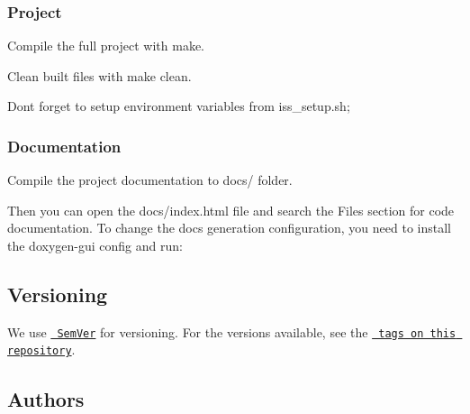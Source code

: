 \subsubsection*{Project}


\begin{DoxyItemize}
\item Compile the full project with {\ttfamily make}.
\item Clean built files with {\ttfamily make clean}.
\end{DoxyItemize}

Don\textquotesingle{}t forget to setup environment variables from {\ttfamily iss\+\_\+setup.\+sh};

\subsubsection*{Documentation}

Compile the project documentation to {\ttfamily docs/} folder. 
\begin{DoxyCode}{0}
\end{DoxyCode}


Then you can open the {\ttfamily docs/index.\+html} file and search the {\ttfamily Files} section for code documentation. To change the docs generation configuration, you need to install the {\ttfamily doxygen-\/gui} config and run\+: 
\begin{DoxyCode}{0}
\end{DoxyCode}


\subsection*{Versioning}

We use \href{http://semver.org/}{\texttt{ Sem\+Ver}} for versioning. For the versions available, see the \href{https://github.com/FranciscoKnebel/quansershield2/tags}{\texttt{ tags on this repository}}.

\subsection*{Authors}

